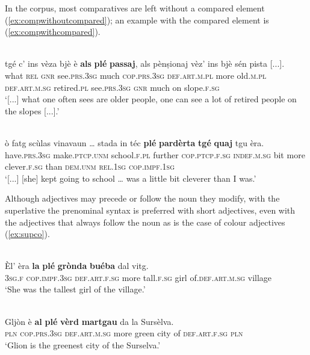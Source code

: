 In the corpus, most comparatives are left without a compared element (\ref{ex:compwithoutcompared}); an example with the compared element is (\ref{ex:compwithcompared}).

\ea
\label{ex:compwithoutcompared}
\\
	\gll [...] tgé c’ ins vèza bjè è \textbf{als} \textbf{plé} \textbf{passaj}, als pènṣionaj vèz’ ins bjè sén pista [...].\\
{} what \textsc{rel} \textsc{gnr} see.\textsc{prs.3sg} much \textsc{cop.prs.3sg} \textsc{def.art.m.pl} more old.\textsc{m.pl} \textsc{def.art.m.sg} retired.\textsc{pl} see.\textsc{prs.3sg} \textsc{gnr} much on slope.\textsc{f.sg}\\
\glt `[...] what one often sees are older people, one can see a lot of retired people on the slopes [...].'
\z

\ea
\label{ex:compwithcompared}
\\
\gll    [...] ò fatg scùlas vinavaun … stada in téc \textbf{plé} \textbf{pardèrta} \textbf{tgé} \textbf{quaj} tgu èra.\\
{} have.\textsc{prs.3sg} make.\textsc{ptcp.unm} school.\textsc{f.pl} further {} \textsc{cop.ptcp.f.sg} \textsc{indef.m.sg} bit more  clever.\textsc{f.sg} than \textsc{dem.unm} \textsc{rel.1sg} \textsc{cop.impf.1sg} \\
\glt `[...] [she] kept going to school … was a little bit cleverer than I was.'
\z

Although adjectives may precede or follow the noun they modify, with the superlative the prenominal syntax is preferred with short adjectives, even with the adjectives that always follow the noun as is the case of colour adjectives (\ref{ex:supco}).

\ea
\label{l}
\\
	\gll Èl’ èra \textbf{la} \textbf{plé} \textbf{grònda} \textbf{buéba} dal vitg.  \\
\textsc{3sg.f} \textsc{cop.impf.3sg} \textsc{def.art.f.sg} more tall.\textsc{f.sg} girl of.\textsc{def.art.m.sg} village	\\
\glt `She was the tallest girl of the village.'
\z

\ea
\label{ex:supco}
\\
\gll Gljòn è \textbf{al} \textbf{plé} \textbf{vèrd} \textbf{martgau} da la Sursèlva.\\
\textsc{pln} \textsc{cop.prs.3sg} \textsc{def.art.m.sg} more green city of \textsc{def.art.f.sg} \textsc{pln}\\
\glt `Glion is the greenest city of the Surselva.'
\z

